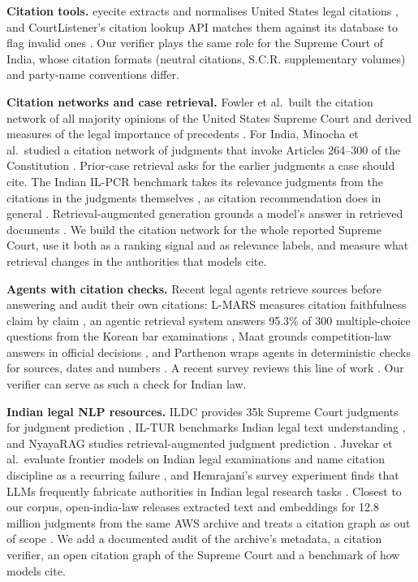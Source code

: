 \documentclass[conference]{IEEEtran}
\begin{document}
\textbf{Citation tools.} eyecite extracts and normalises United States legal citations \cite{eyecite}, and CourtListener's citation lookup API matches them against its database to flag invalid ones \cite{courtlistenerapi}. Our verifier plays the same role for the Supreme Court of India, whose citation formats (neutral citations, S.C.R. supplementary volumes) and party-name conventions differ.

\textbf{Citation networks and case retrieval.} Fowler et al.\ built the citation network of all majority opinions of the United States Supreme Court and derived measures of the legal importance of precedents \cite{fowler2007}. For India, Minocha et al.\ studied a citation network of judgments that invoke Articles 264--300 of the Constitution \cite{minocha2015}. Prior-case retrieval asks for the earlier judgments a case should cite. The Indian IL-PCR benchmark takes its relevance judgments from the citations in the judgments themselves \cite{joshi2023ucreat}, as citation recommendation does in general \cite{farber2020}. Retrieval-augmented generation grounds a model's answer in retrieved documents \cite{lewis2020rag}. We build the citation network for the whole reported Supreme Court, use it both as a ranking signal and as relevance labels, and measure what retrieval changes in the authorities that models cite.

\textbf{Agents with citation checks.} Recent legal agents retrieve sources before answering and audit their own citations: L-MARS measures citation faithfulness claim by claim \cite{lmars}, an agentic retrieval system answers 95.3\% of 300 multiple-choice questions from the Korean bar examinations \cite{koreanrag}, Maat grounds competition-law answers in official decisions \cite{maat}, and Parthenon wraps agents in deterministic checks for sources, dates and numbers \cite{parthenon}. A recent survey reviews this line of work \cite{liu2026survey}. Our verifier can serve as such a check for Indian law.

\textbf{Indian legal NLP resources.} ILDC provides 35k Supreme Court judgments for judgment prediction \cite{ildc}, IL-TUR benchmarks Indian legal text understanding \cite{iltur}, and NyayaRAG studies retrieval-augmented judgment prediction \cite{nyayarag}. Juvekar et al.\ evaluate frontier models on Indian legal examinations and name citation discipline as a recurring failure \cite{juvekar2025}, and Hemrajani's survey experiment finds that LLMs frequently fabricate authorities in Indian legal research tasks \cite{hemrajani2025}. Closest to our corpus, open-india-law releases extracted text and embeddings for 12.8 million judgments from the same AWS archive and treats a citation graph as out of scope \cite{openindialaw}. We add a documented audit of the archive's metadata, a citation verifier, an open citation graph of the Supreme Court and a benchmark of how models cite.
\end{document}
